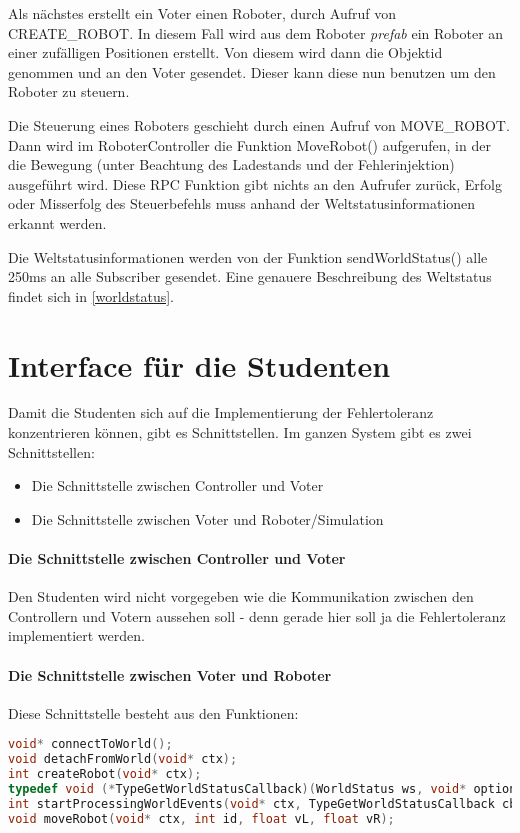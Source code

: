 Als n{\"{a}}chstes erstellt ein Voter einen Roboter, durch Aufruf von CREATE\_ROBOT. In diesem Fall wird aus dem Roboter \textit{prefab} ein Roboter an einer
zuf{\"{a}}lligen Positionen erstellt. Von diesem wird dann die Objektid genommen und an den Voter gesendet. Dieser kann diese nun benutzen um den Roboter zu
steuern.

Die Steuerung eines Roboters geschieht durch einen Aufruf von MOVE\_ROBOT. Dann wird im RoboterController die Funktion MoveRobot() aufgerufen, in der die
Bewegung (unter Beachtung des Ladestands und der Fehlerinjektion) ausgef{\"{u}}hrt wird. Diese RPC Funktion gibt nichts an den Aufrufer zur{\"{u}}ck, Erfolg
oder Misserfolg des Steuerbefehls muss anhand der Weltstatusinformationen erkannt werden.

Die Weltstatusinformationen werden von der Funktion sendWorldStatus() alle 250ms an alle Subscriber gesendet. Eine genauere Beschreibung des Weltstatus findet
sich in \ref{worldstatus}.

\clearpage
\section{Interface f{\"{u}}r die Studenten}\label{interface}
Damit die Studenten sich auf die Implementierung der Fehlertoleranz konzentrieren k{\"{o}}nnen, gibt es Schnittstellen.
Im ganzen System gibt es zwei Schnittstellen:
\begin{itemize}
\item Die Schnittstelle zwischen Controller und Voter
\item Die Schnittstelle zwischen Voter und Roboter/Simulation
\end{itemize}

\paragraph{Die Schnittstelle zwischen Controller und Voter} Den Studenten wird nicht vorgegeben wie die Kommunikation zwischen den Controllern und Votern aussehen soll - denn gerade hier soll ja die Fehlertoleranz implementiert werden.

\paragraph{Die Schnittstelle zwischen Voter und Roboter} Diese Schnittstelle besteht aus den Funktionen:
\begin{lstlisting}[frame=single, language=c] 
void* connectToWorld();
void detachFromWorld(void* ctx);
int createRobot(void* ctx);
typedef void (*TypeGetWorldStatusCallback)(WorldStatus ws, void* optional);
int startProcessingWorldEvents(void* ctx, TypeGetWorldStatusCallback cb, void* optional);
void moveRobot(void* ctx, int id, float vL, float vR);
\end{lstlisting}

